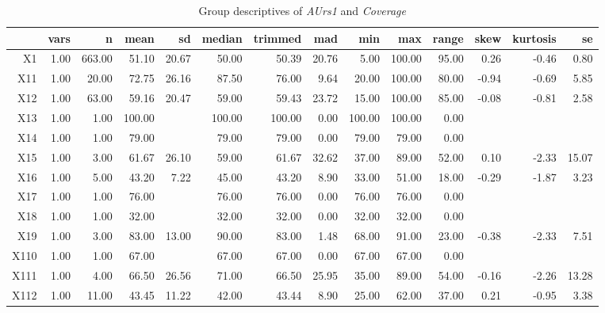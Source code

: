 \begin{table}[ht]
	\small
	\centering
    \begin{tabular}{rrrrrrrrrrrrrr}
        \hline
        & vars & n & mean & sd & median & trimmed & mad & min & max & range & skew & kurtosis & se \\ 
        \hline
        X1 & 1.00 & 663.00 & 51.10 & 20.67 & 50.00 & 50.39 & 20.76 & 5.00 & 100.00 & 95.00 & 0.26 & -0.46 & 0.80 \\ 
        X11 & 1.00 & 20.00 & 72.75 & 26.16 & 87.50 & 76.00 & 9.64 & 20.00 & 100.00 & 80.00 & -0.94 & -0.69 & 5.85 \\ 
        X12 & 1.00 & 63.00 & 59.16 & 20.47 & 59.00 & 59.43 & 23.72 & 15.00 & 100.00 & 85.00 & -0.08 & -0.81 & 2.58 \\ 
        X13 & 1.00 & 1.00 & 100.00 &  & 100.00 & 100.00 & 0.00 & 100.00 & 100.00 & 0.00 &  &  &  \\ 
        X14 & 1.00 & 1.00 & 79.00 &  & 79.00 & 79.00 & 0.00 & 79.00 & 79.00 & 0.00 &  &  &  \\ 
        X15 & 1.00 & 3.00 & 61.67 & 26.10 & 59.00 & 61.67 & 32.62 & 37.00 & 89.00 & 52.00 & 0.10 & -2.33 & 15.07 \\ 
        X16 & 1.00 & 5.00 & 43.20 & 7.22 & 45.00 & 43.20 & 8.90 & 33.00 & 51.00 & 18.00 & -0.29 & -1.87 & 3.23 \\ 
        X17 & 1.00 & 1.00 & 76.00 &  & 76.00 & 76.00 & 0.00 & 76.00 & 76.00 & 0.00 &  &  &  \\ 
        X18 & 1.00 & 1.00 & 32.00 &  & 32.00 & 32.00 & 0.00 & 32.00 & 32.00 & 0.00 &  &  &  \\ 
        X19 & 1.00 & 3.00 & 83.00 & 13.00 & 90.00 & 83.00 & 1.48 & 68.00 & 91.00 & 23.00 & -0.38 & -2.33 & 7.51 \\ 
        X110 & 1.00 & 1.00 & 67.00 &  & 67.00 & 67.00 & 0.00 & 67.00 & 67.00 & 0.00 &  &  &  \\ 
        X111 & 1.00 & 4.00 & 66.50 & 26.56 & 71.00 & 66.50 & 25.95 & 35.00 & 89.00 & 54.00 & -0.16 & -2.26 & 13.28 \\ 
        X112 & 1.00 & 11.00 & 43.45 & 11.22 & 42.00 & 43.44 & 8.90 & 25.00 & 62.00 & 37.00 & 0.21 & -0.95 & 3.38 \\ 
        \hline
      \end{tabular}
    \caption{Group descriptives of \textit{AUrs1} and \textit{Coverage}}
    \label{tbl:descriptives_baysis_initiator_AUrs1_Cov}
\end{table}

